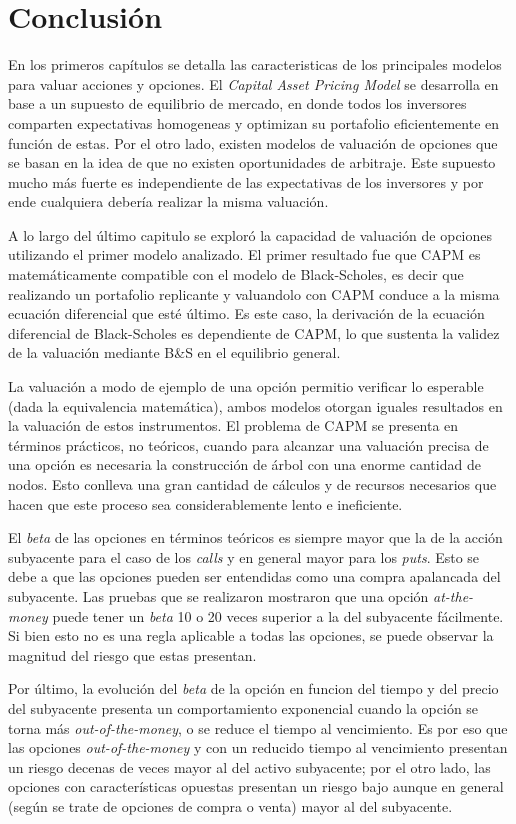 
\chapter{Conclusión}\label{Conclusion}

En los primeros capítulos se detalla las caracteristicas de los principales modelos para valuar acciones y opciones. El \textit{Capital Asset Pricing Model} se desarrolla en base a un supuesto de equilibrio de mercado, en donde todos los inversores comparten expectativas homogeneas y optimizan su portafolio eficientemente en función de estas. Por el otro lado, existen modelos de valuación de opciones que se basan en la idea de que no existen oportunidades de arbitraje. Este supuesto mucho más fuerte es independiente de las expectativas de los inversores y por ende cualquiera debería realizar la misma valuación.

A lo largo del último capitulo se exploró la capacidad de valuación de opciones utilizando el primer modelo analizado. El primer resultado fue que CAPM es matemáticamente compatible con el modelo de Black-Scholes, es decir que realizando un portafolio replicante y valuandolo con CAPM conduce a la misma ecuación diferencial que esté último. Es este caso, la derivación de la ecuación diferencial de Black-Scholes es dependiente de CAPM, lo que sustenta la validez de la valuación mediante B\&S en el equilibrio general.

La valuación a modo de ejemplo de una opción permitio verificar lo esperable (dada la equivalencia matemática), ambos modelos otorgan iguales resultados en la valuación de estos instrumentos. El problema de CAPM se presenta en términos prácticos, no teóricos, cuando para alcanzar una valuación precisa de una opción es necesaria la construcción de árbol con una enorme cantidad de nodos. Esto conlleva una gran cantidad de cálculos y de recursos necesarios que hacen que este proceso sea considerablemente lento e ineficiente.

El \textit{beta} de las opciones en términos teóricos es siempre mayor que la de la acción subyacente para el caso de los \textit{calls} y en general mayor para los \textit{puts}. Esto se debe a que las opciones pueden ser entendidas como una compra apalancada del subyacente. Las pruebas que se realizaron mostraron que una opción \textit{at-the-money} puede tener un \textit{beta} 10 o 20 veces superior a la del subyacente fácilmente. Si bien esto no es una regla aplicable a todas las opciones, se puede observar la magnitud del riesgo que estas presentan.

Por último, la evolución del \textit{beta} de la opción en funcion del tiempo y del precio del subyacente presenta un comportamiento exponencial cuando la opción se torna más \textit{out-of-the-money}, o se reduce el tiempo al vencimiento. Es por eso que las opciones \textit{out-of-the-money} y con un reducido tiempo al vencimiento presentan un riesgo decenas de veces mayor al del activo subyacente; por el otro lado, las opciones con características opuestas presentan un riesgo bajo aunque en general (según se trate de opciones de compra o venta) mayor al del subyacente.


